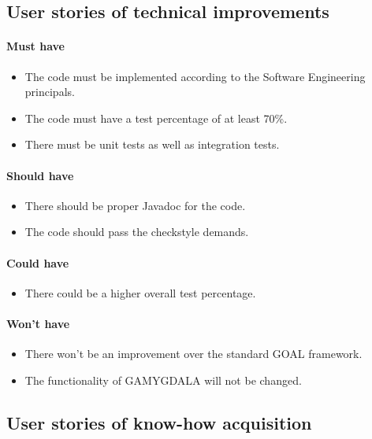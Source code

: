 \subsection{User stories of technical improvements}
\paragraph{Must have} 
\begin{itemize}
\item The code must be implemented according to the Software Engineering principals.
\item The code must have a test percentage of at least 70\%.
\item There must be unit tests as well as integration tests.
\end{itemize}

\paragraph{Should have} 
\begin{itemize}
\item There should be proper Javadoc for the code.
\item The code should pass the checkstyle demands.
\end{itemize}

\paragraph{Could have} 
\begin{itemize}
\item There could be a higher overall test percentage.
\end{itemize}

\paragraph{Won't have} 
\begin{itemize}
\item There won't be an improvement over the standard GOAL framework.
\item The functionality of GAMYGDALA will not be changed.
\end{itemize}

\subsection{User stories of know-how acquisition}
